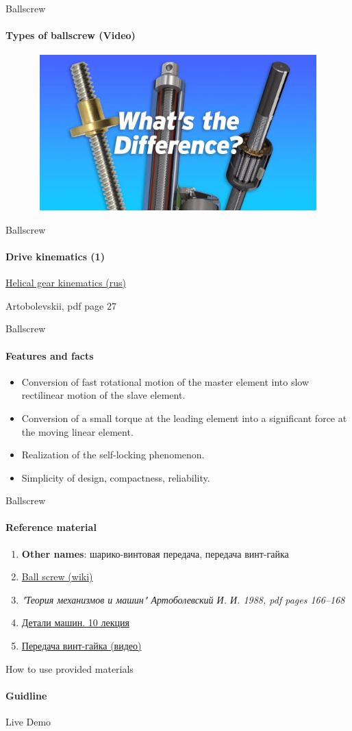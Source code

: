\documentclass[aspectratio=169]{beamer}
\newcommand{\fbckg}[1]{\usebackgroundtemplate{\texttt{[image: \#1]}}}%
\begin{document}
\begin{frame}[t]{Ballscrew}
    \framesubtitle{Types of ballscrew (Video)}
    \vspace{-0.6cm}
    \begin{figure}[H]
        \href{https://youtu.be/1P6nbs1-4dQ}{
            \centering\includegraphics[height=6cm,width=1\textwidth,keepaspectratio]{ballscrew_types_preview.jpg}}
        \label{fig:ballscrew_types_preview.jpg}
    \end{figure}
\end{frame}

\begin{frame}[t]{Ballscrew}
    \framesubtitle{Drive kinematics (1)}
    \href{https://studfile.net/preview/4295396/page:16/}{Helical gear kinematics (rus)}
    
    Artobolevskii, pdf page 27
\end{frame}

\begin{frame}[t]{Ballscrew}
    \framesubtitle{Features and facts}
    \begin{itemize}
        \item Conversion of fast rotational motion of the master element into slow rectilinear motion of the slave element.
        \item Conversion of a small torque at the leading element into a significant force at the moving linear element.
        \item Realization of the self-locking phenomenon.
        \item Simplicity of design, compactness, reliability.
    \end{itemize}
\end{frame}

\begin{frame}[t]{Ballscrew}
    \framesubtitle{Reference material}
    \begin{enumerate}
        \item \textbf{Other names}: шарико-винтовая передача, передача винт-гайка
        \item \href{https://en.wikipedia.org/wiki/Ball_screw}{Ball screw (wiki)}
        \item \textit{"Теория механизмов и машин" Артоболевский И. И. 1988, pdf pages 166--168 }
        \item \href{https://studfile.net/preview/2156460/}{Детали машин. 10 лекция}
        \item \href{https://youtu.be/kcrnG13NKCw}{Передача винт-гайка (видео)}
    \end{enumerate}
\end{frame}

\begin{frame}[c]{How to use provided materials}
\framesubtitle{Guidline}
    \Huge
    \centering
    Live Demo
\end{frame}


\fbckg{fibeamer/figs/last_page.png}
\frame[plain]{}
\end{document}
